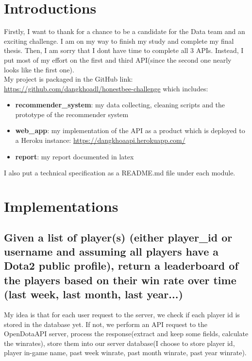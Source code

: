 
\section{Introductions}

Firstly, I want to thank for a chance to be a candidate for the Data team and an exciting challenge. I am on my way to finish my study and complete my final thesis. Then, I am sorry that I dont have time to complete all 3 APIs. Instead, I put most of my effort on the first and third API(since the second one nearly looks like the first one). \\

\noindent My project is packaged in the GitHub link: \url{https://github.com/dangkhoadl/honestbee-challenge} which includes:
\begin{itemize}
    \item \textbf{recommender\_system}: my data collecting, cleaning scripts and the prototype of the recommender system
    \item \textbf{web\_app}: my implementation of the API as a product which is deployed to a Heroku instance: \url{https://dangkhoaapi.herokuapp.com/}
    \item \textbf{report}: my report documented in latex
\end{itemize}

\noindent I also put a technical specification as a README.md file under each module. 

\section{Implementations}

\subsection{Given a list of player(s) (either player\_id or username and assuming all players have a Dota2 public profile), return a leaderboard of the players based on their win rate over time (last week, last month, last year...)}

My idea is that for each user request to the server, we check if each player id is stored in the database yet. If not, we perform an API request to the OpenDotaAPI server, process the response(extract and keep some fields, calculate the winrates), store them into our server database(I choose to store player id, player in-game name, past week winrate, past month winrate, past year winrate). \\

